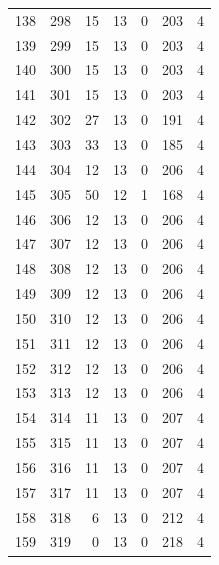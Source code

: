 \documentclass[a4paper,twoside,12pt]{book}
\begin{document}
\begin{appendices}
\begin{table}
\begin{tabular}{lrrrrrr}
		138 &    298 &        15 &        13 &               0 &             203 &         4 \\
		139 &    299 &        15 &        13 &               0 &             203 &         4 \\
		140 &    300 &        15 &        13 &               0 &             203 &         4 \\
		141 &    301 &        15 &        13 &               0 &             203 &         4 \\
		142 &    302 &        27 &        13 &               0 &             191 &         4 \\
		143 &    303 &        33 &        13 &               0 &             185 &         4 \\
		144 &    304 &        12 &        13 &               0 &             206 &         4 \\
		145 &    305 &        50 &        12 &               1 &             168 &         4 \\
		146 &    306 &        12 &        13 &               0 &             206 &         4 \\
		147 &    307 &        12 &        13 &               0 &             206 &         4 \\
		148 &    308 &        12 &        13 &               0 &             206 &         4 \\
		149 &    309 &        12 &        13 &               0 &             206 &         4 \\
		150 &    310 &        12 &        13 &               0 &             206 &         4 \\
		151 &    311 &        12 &        13 &               0 &             206 &         4 \\
		152 &    312 &        12 &        13 &               0 &             206 &         4 \\
		153 &    313 &        12 &        13 &               0 &             206 &         4 \\
		154 &    314 &        11 &        13 &               0 &             207 &         4 \\
		155 &    315 &        11 &        13 &               0 &             207 &         4 \\
		156 &    316 &        11 &        13 &               0 &             207 &         4 \\
		157 &    317 &        11 &        13 &               0 &             207 &         4 \\
		158 &    318 &         6 &        13 &               0 &             212 &         4 \\
		159 &    319 &         0 &        13 &               0 &             218 &         4 \\
		\bottomrule
	\end{tabular}				
\end{table}	


\end{appendices}
\end{document}
